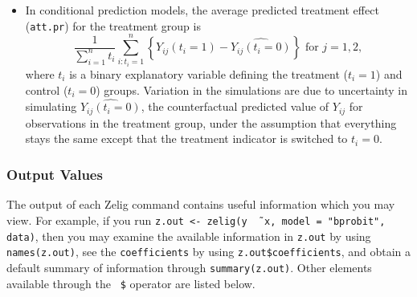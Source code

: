 \documentclass{article}
\begin{document}
\begin{itemize}
\item In conditional prediction models, the average predicted treatment
  effect ({\tt att.pr}) for the treatment group is 
    \begin{equation*} \frac{1}{\sum_{i=1}^n t_i}\sum_{i:t_i=1}^n \left\{ Y_{ij}(t_i=1) -
      \widehat{Y_{ij}(t_i=0)}\right\} \textrm{ for } j = 1,2,
    \end{equation*} 
    where $t_i$ is a binary explanatory variable defining the treatment
    ($t_i=1$) and control ($t_i=0$) groups.  Variation in the
    simulations are due to uncertainty in simulating
    $\widehat{Y_{ij}(t_i=0)}$, the counterfactual predicted value of
    $Y_{ij}$ for observations in the treatment group, under the
    assumption that everything stays the same except that the
    treatment indicator is switched to $t_i=0$.

\end{itemize}

\subsubsection{Output Values}

The output of each Zelig command contains useful information which you
may view.  For example, if you run \texttt{z.out <- zelig(y \~\, x,
  model = "bprobit", data)}, then you may examine the available
information in \texttt{z.out} by using \texttt{names(z.out)},
see the {\tt coefficients} by using {\tt z.out\$coefficients}, and
obtain a default summary of information through
\texttt{summary(z.out)}.  Other elements available through the {\tt
  \$} operator are listed below.
\end{document}
